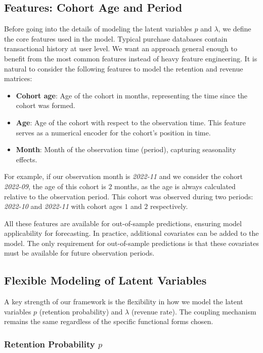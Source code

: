 \documentclass[11pt]{amsart}
\theoremstyle{definition}
\begin{document}
\subsection{Features: Cohort Age and Period}

Before going into the details of modeling the latent variables $p$ and $\lambda$, we define the core features used in the model.
Typical purchase databases contain transactional history at user level. We want an approach general enough to benefit
from the most common features instead of heavy feature engineering. It is natural to consider the following features 
to model the retention and revenue matrices:

\begin{itemize}
    \item {\bf Cohort age}: Age of the cohort in months, representing the time since the cohort was formed.
    \item {\bf Age}: Age of the cohort with respect to the observation time.
          This feature serves as a numerical encoder for the cohort's position in time.
    \item {\bf Month}: Month of the observation time (period), capturing seasonality effects.
\end{itemize}

For example, if our observation month is {\em 2022-11} and we consider the cohort {\em 2022-09}, the age of this cohort
is $2$ months, as the age is always calculated relative to the observation period. This cohort was observed during two
periods: {\em 2022-10} and {\em 2022-11} with cohort ages $1$ and $2$ respectively.

All these features are available for out-of-sample predictions, ensuring model applicability for forecasting.
In practice, additional covariates can be added to the model. The only requirement for out-of-sample predictions is that
these covariates must be available for future observation periods.

\subsection{Flexible Modeling of Latent Variables}

A key strength of our framework is the flexibility in how we model the latent variables $p$ (retention probability) and 
$\lambda$ (revenue rate). The coupling mechanism remains the same regardless of the specific functional forms chosen.

\subsubsection{Retention Probability $p$}
\end{document}
